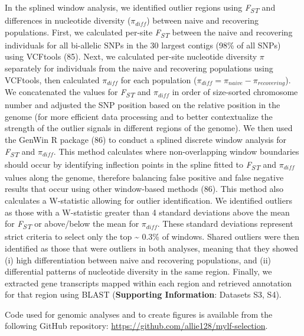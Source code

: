 \documentclass[9pt,twocolumn,twoside,lineno]{pnas-new}
\begin{document}
{In the splined window analysis, we identified outlier regions using
\emph{F\textsubscript{ST}} and differences in nucleotide diversity
(\(\pi_{diff}\)) between naive and recovering populations. First, we
calculated per-site \emph{F\textsubscript{ST}} between the naive and
recovering individuals for all bi-allelic SNPs in the 30 largest contigs
(98\% of all SNPs) using VCFtools (85). Next, we calculated per-site
nucleotide diversity \(\pi\) separately for individuals from the naive
and recovering populations using VCFtools, then calculated
\(\pi_{diff}\) for each population
(\(\pi_{diff} = \pi_{naive} - \pi_{recovering}\)). We concatenated the
values for \emph{F\textsubscript{ST}} and \(\pi_{diff}\) in order of
size-sorted chromosome number and adjusted the SNP position based on the
relative position in the genome (for more efficient data processing and
to better contextualize the strength of the outlier signals in different
regions of the genome). We then used the GenWin R package (86) to
conduct a splined discrete window analysis for
\emph{F\textsubscript{ST}} and \(\pi_{diff}\). This method calculates
where non-overlapping window boundaries should occur by identifying
inflection points in the spline fitted to \emph{F\textsubscript{ST}} and
\(\pi_{diff}\) values along the genome, therefore balancing false
positive and false negative results that occur using other window-based
methods (86). This method also calculates a W-statistic allowing for
outlier identification. We identified outliers as those with a
W-statistic greater than 4 standard deviations above the mean for
\emph{F\textsubscript{ST}} or above/below the mean for \(\pi_{diff}\).
These standard deviations represent strict criteria to select only the
top \textasciitilde{} 0.3\% of windows. Shared outliers were then
identified as those that were outliers in both analyses, meaning that
they showed (i) high differentiation between naive and recovering
populations, and (ii) differential patterns of nucleotide diversity in
the same region. Finally, we extracted gene transcripts mapped within
each region and retrieved annotation for that region using BLAST
(\textbf{Supporting Information}: Datasets S3, S4).

Code used for genomic analyses and to create figures is available from
the following GitHub repository:
\url{https://github.com/allie128/mylf-selection}.

}


\showmatmethods{} %
\end{document}
